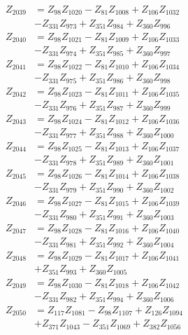 \begin{multicols}{2}
\begin{align}
Z_{2039} &= Z_{98}Z_{1020} - Z_{81}Z_{1008} + Z_{106}Z_{1032}  \nonumber \\
&- Z_{331}Z_{973} + Z_{351}Z_{984} + Z_{360}Z_{996} \nonumber \\
Z_{2040} &= Z_{98}Z_{1021} - Z_{81}Z_{1009} + Z_{106}Z_{1033}  \nonumber \\
&- Z_{331}Z_{974} + Z_{351}Z_{985} + Z_{360}Z_{997} \nonumber \\
Z_{2041} &= Z_{98}Z_{1022} - Z_{81}Z_{1010} + Z_{106}Z_{1034}  \nonumber \\
&- Z_{331}Z_{975} + Z_{351}Z_{986} + Z_{360}Z_{998} \nonumber \\
Z_{2042} &= Z_{98}Z_{1023} - Z_{81}Z_{1011} + Z_{106}Z_{1035}  \nonumber \\
&- Z_{331}Z_{976} + Z_{351}Z_{987} + Z_{360}Z_{999} \nonumber \\
Z_{2043} &= Z_{98}Z_{1024} - Z_{81}Z_{1012} + Z_{106}Z_{1036}  \nonumber \\
&- Z_{331}Z_{977} + Z_{351}Z_{988} + Z_{360}Z_{1000} \nonumber \\
Z_{2044} &= Z_{98}Z_{1025} - Z_{81}Z_{1013} + Z_{106}Z_{1037}  \nonumber \\
&- Z_{331}Z_{978} + Z_{351}Z_{989} + Z_{360}Z_{1001} \nonumber \\
Z_{2045} &= Z_{98}Z_{1026} - Z_{81}Z_{1014} + Z_{106}Z_{1038}  \nonumber \\
&- Z_{331}Z_{979} + Z_{351}Z_{990} + Z_{360}Z_{1002} \nonumber \\
Z_{2046} &= Z_{98}Z_{1027} - Z_{81}Z_{1015} + Z_{106}Z_{1039}  \nonumber \\
&- Z_{331}Z_{980} + Z_{351}Z_{991} + Z_{360}Z_{1003} \nonumber \\
Z_{2047} &= Z_{98}Z_{1028} - Z_{81}Z_{1016} + Z_{106}Z_{1040}  \nonumber \\
&- Z_{331}Z_{981} + Z_{351}Z_{992} + Z_{360}Z_{1004} \nonumber \\
Z_{2048} &= Z_{98}Z_{1029} - Z_{81}Z_{1017} + Z_{106}Z_{1041}  \nonumber \\
&+ Z_{351}Z_{993} + Z_{360}Z_{1005} \nonumber \\
Z_{2049} &= Z_{98}Z_{1030} - Z_{81}Z_{1018} + Z_{106}Z_{1042}  \nonumber \\
&- Z_{331}Z_{982} + Z_{351}Z_{994} + Z_{360}Z_{1006} \nonumber \\
Z_{2050} &= Z_{117}Z_{1081} - Z_{98}Z_{1107} + Z_{126}Z_{1094}  \nonumber \\
&+ Z_{371}Z_{1043} - Z_{351}Z_{1069} + Z_{382}Z_{1056} \nonumber \\

\end{align}
\end{multicols}
